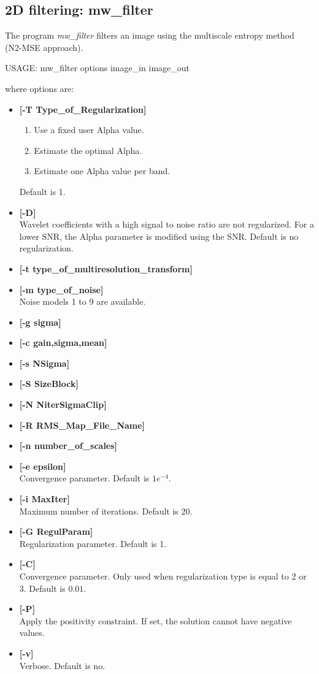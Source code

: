 \subsection{2D filtering: mw\_filter}
The program {\em mw\_filter} filters an image using the 
multiscale entropy method (N2-MSE approach). 
{\bf 
\begin{center}
 USAGE: mw\_filter options image\_in image\_out
\end{center}}
where options are:
\begin{itemize}
\baselineskip=0.4truecm
\itemsep=0.1truecm
\item {\bf[-T Type\_of\_Regularization]}
\begin{enumerate}
\baselineskip=0.4truecm
\itemsep=0.1truecm
\item Use a fixed user Alpha value.
\item Estimate the optimal Alpha.
\item Estimate one  Alpha value per band.
\end{enumerate}
Default is 1.
\item {\bf [-D]} \\
Wavelet coefficients with a high signal to noise ratio are not
regularized. For a lower SNR, the Alpha parameter is modified using the SNR.
Default is no regularization.
\item {\bf [-t type\_of\_multiresolution\_transform]} 
\item {\bf [-m type\_of\_noise]} \\
Noise models 1 to 9 are available.
\item {\bf [-g sigma]} 
\item {\bf [-c gain,sigma,mean]}
\item {\bf [-s NSigma]} 
\item {\bf [-S SizeBlock]} 
\item {\bf [-N NiterSigmaClip]} 
\item {\bf [-R RMS\_Map\_File\_Name]} 
\item {\bf [-n number\_of\_scales]} 
\item {\bf [-e epsilon]} \\
Convergence parameter. Default is $1e^{-4}$.
\item {\bf [-i MaxIter]} \\
Maximum number of iterations. Default is 20.
\item {\bf [-G RegulParam]} \\
Regularization parameter. Default is 1.
\item {\bf [-C]} \\
Convergence parameter. Only used when regularization type is equal to
2 or 3.
Default is $0.01$.
\item {\bf [-P]} \\
Apply the positivity constraint. If set, the solution cannot have negative 
values.
\item {\bf [-v]} \\
Verbose. Default is no.
\end{itemize}

